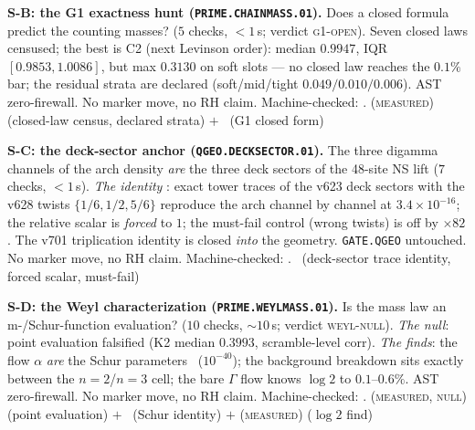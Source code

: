 \par\smallskip\noindent\textbf{S-B: the G1 exactness hunt
(\texttt{PRIME.CHAINMASS.01}).}
Does a closed formula predict the counting masses? ($5$ checks,
${<}1$\,s; verdict \textsc{g1-open}).  Seven closed laws censused;
the best is C2 (next Levinson order): median $0.9947$, IQR
$[0.9853,1.0086]$, but max $0.3130$ on soft slots --- no closed law
reaches the $0.1\%$ bar; the residual strata are declared
(soft/mid/tight $0.049/0.010/0.006$).  AST zero-firewall.  No marker
move, no RH claim.
Machine-checked: .
(\textsc{measured}) (closed-law census, declared strata) $+$ \mO\
(G1 closed form)
\par\smallskip


\par\smallskip\noindent\textbf{S-C: the deck-sector anchor
(\texttt{QGEO.DECKSECTOR.01}).}
The three digamma channels of the arch density \emph{are} the three
deck sectors of the 48-site NS lift ($7$ checks, ${<}1$\,s).
\emph{The identity} \mE: exact tower traces of the v623 deck sectors
with the v628 twists $\{1/6,1/2,5/6\}$ reproduce the arch channel by
channel at $3.4\times10^{-16}$; the relative scalar is \emph{forced}
to $1$; the must-fail control (wrong twists) is off by $\times82$.
The v701 triplication identity is closed \emph{into} the geometry.
\texttt{GATE.QGEO} untouched.  No marker move, no RH claim.
Machine-checked: .
\mE\ (deck-sector trace identity, forced scalar, must-fail)
\par\smallskip


\par\smallskip\noindent\textbf{S-D: the Weyl characterization
(\texttt{PRIME.WEYLMASS.01}).}
Is the mass law an m-/Schur-function evaluation? ($10$ checks,
${\sim}10$\,s; verdict \textsc{weyl-null}).  \emph{The null}: point
evaluation falsified (K2 median $0.3993$, scramble-level corr).
\emph{The finds}: the flow $\alpha$ \emph{are} the Schur parameters
\mE\ ($10^{-40}$); the background breakdown sits exactly between the
$n=2$/$n=3$ cell; the bare $\Gamma$ flow knows $\log 2$ to
$0.1$--$0.6\%$.  AST zero-firewall.  No marker move, no RH claim.
Machine-checked: \veri{v706\_chain\_weyl\_mass.py}.
(\textsc{measured}, \textsc{null}) (point evaluation) $+$ \mE\
(Schur identity) $+$ (\textsc{measured}) ($\log 2$ find)
\par\smallskip


